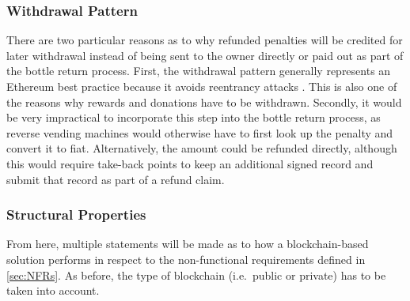 \subsubsection{Withdrawal Pattern}
There are two particular reasons as to why refunded penalties will be credited for later withdrawal instead of being sent to the owner directly or paid out as part of the bottle return process. First, the withdrawal pattern generally represents an Ethereum best practice because it avoids reentrancy attacks \cite[pp.~121, 169]{solidityDocs}. This is also one of the reasons why rewards and donations have to be withdrawn. Secondly, it would be very impractical to incorporate this step into the bottle return process, as reverse vending machines would otherwise have to first look up the penalty and convert it to fiat. Alternatively, the amount could be refunded directly, although this would require take-back points to keep an additional signed record and submit that record as part of a refund claim.

\subsubsection{Structural Properties}
\label{sec:blockchainValueAdd}
From here, multiple statements will be made as to how a blockchain-based solution performs in respect to the non-functional requirements defined in \autoref{sec:NFRs}. As before, the type of blockchain (i.e.~public or private) has to be taken into account.

